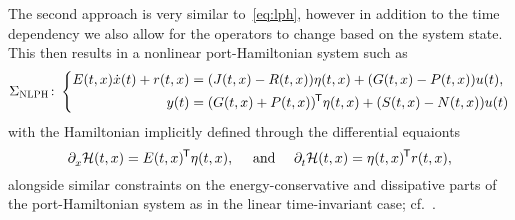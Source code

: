 The second approach is very similar to~\eqref{eq:lph}, however in addition to the time dependency we also allow for the operators to change based on the system state.
This then results in a nonlinear port-Hamiltonian system such as
\begin{equation}\label{eq:nlph}
    \Sigma_{\textsc{NLPH}} \colon \left\lbrace
    \begin{aligned}
        E(t, x) \dot{x}(t) + r(t, x) &= (J(t, x) - R(t, x)) \eta(t, x) + (G(t, x) - P(t, x)) u(t), \\
        y(t) &= (G(t, x) + P(t, x))\trans \eta(t, x) + (S(t, x) - N(t, x)) u(t)
    \end{aligned}
    \right.
\end{equation}
with the Hamiltonian implicitly defined through the differential equaionts
\begin{equation*}
    \pd{} \mcl{H}(t, x) = E(t, x)\trans \eta(t, x),\quad \text{ and }\quad \pd[t]{} \mcl{H}(t, x) = \eta(t, x)\trans r(t, x),
\end{equation*}
alongside similar constraints on the energy-conservative and dissipative parts of the port-Hamiltonian system as in the linear time-invariant case; cf.~\cite[Definition~4.1]{Mehrmann2022}.

